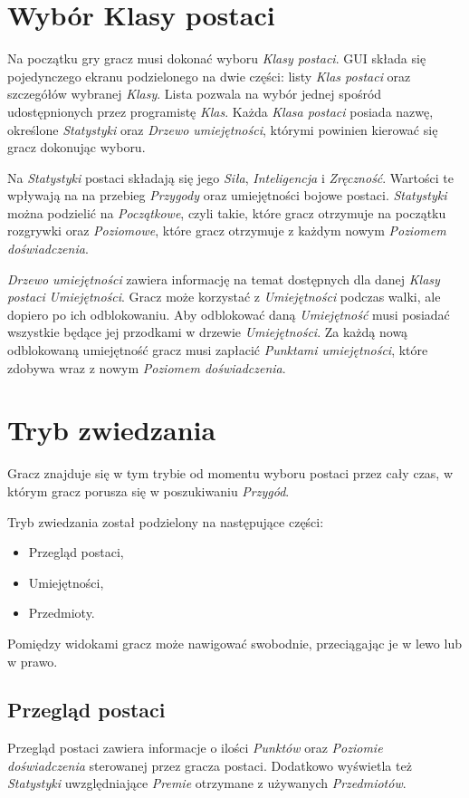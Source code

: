 \documentclass[openright]{xmgr}
\begin{document}
\section{Wybór Klasy postaci}

Na początku gry gracz musi dokonać wyboru \textit{Klasy postaci}. GUI składa się pojedynczego ekranu podzielonego na dwie części: listy \textit{Klas postaci} oraz szczegółów wybranej \textit{Klasy}. Lista pozwala na wybór jednej spośród udostępnionych przez programistę \textit{Klas}. Każda \textit{Klasa postaci} posiada nazwę, określone \textit{Statystyki} oraz \textit{Drzewo umiejętności}, którymi powinien kierować się gracz dokonując wyboru.

Na \textit{Statystyki} postaci składają się  jego \textit{Siła}, \textit{Inteligencja} i \textit{Zręczność}. Wartości te wpływają na na przebieg \textit{Przygody} oraz umiejętności bojowe postaci. \textit{Statystyki} można podzielić na \textit{Początkowe}, czyli takie, które gracz otrzymuje na początku rozgrywki oraz \textit{Poziomowe}, które gracz otrzymuje z każdym nowym \textit{Poziomem doświadczenia}.

\textit{Drzewo umiejętności} zawiera informację na temat dostępnych dla danej \textit{Klasy postaci} \textit{Umiejętności}. Gracz może korzystać z \textit{Umiejętności} podczas walki, ale dopiero po ich odblokowaniu. Aby odblokować daną \textit{Umiejętność} musi posiadać wszystkie będące jej przodkami w drzewie \textit{Umiejętności}. Za każdą nową odblokowaną umiejętność gracz musi zapłacić \textit{Punktami umiejętności}, które zdobywa wraz z nowym \textit{Poziomem doświadczenia}.

\section{Tryb zwiedzania}

Gracz znajduje się w tym trybie od momentu wyboru postaci przez cały czas, w którym gracz porusza się w poszukiwaniu \textit{Przygód}. 

Tryb zwiedzania został podzielony na następujące części: 
\begin{itemize}
	\item Przegląd postaci,
	\item Umiejętności,
	\item Przedmioty.
\end{itemize}
Pomiędzy widokami gracz może nawigować swobodnie, przeciągając je w lewo lub w prawo.
\subsection*{Przegląd postaci}
Przegląd postaci zawiera informacje o ilości \textit{Punktów} oraz \textit{Poziomie doświadczenia} sterowanej przez gracza postaci. Dodatkowo wyświetla też \textit{Statystyki} uwzględniające \textit{Premie} otrzymane z używanych \textit{Przedmiotów}.
\end{document}
